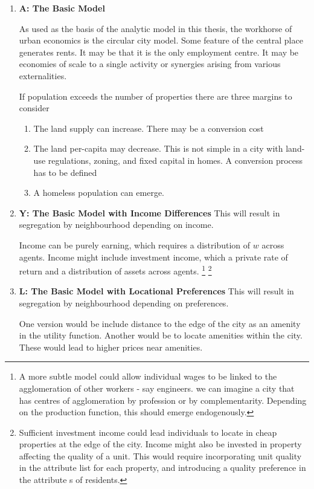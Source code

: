 \begin{enumerate}
\item \textbf{A: The Basic Model}

As used as the basis of the analytic model in this thesis, the workhorse of urban economics is the circular city model. Some feature of the central place generates rents. It may be that it is the only employment centre. It may be economies of scale to a single activity or synergies arising from various externalities.

If population exceeds the number of properties there are three margins to consider
	\begin{enumerate}
		\item The land supply can increase. There may be a conversion cost
		\item The land per-capita may decrease. This is not simple in a city with land-use regulations, zoning, and fixed capital in homes. A conversion process has to be defined
		\item A homeless population can emerge. 
	\end{enumerate}
	
\item \textbf{Y: The Basic Model with Income Differences}
This will result in segregation by neighbourhood depending on income. 

Income can be purely earning, which requires a distribution of $w$ across agents. Income  might include investment income, which  a private rate of return and a distribution of assets across agents. \footnote{A more subtle model could allow individual wages to be linked to the agglomeration of other workers - say engineers. we can imagine a city that has centres of agglomeration by profession or by complementarity. Depending on the production function, this should emerge endogenously.}
\footnote{Sufficient investment income could lead individuals to locate in cheap properties at the edge of the city.  Income might also be invested in property affecting the quality of a unit. This would require incorporating unit quality in the attribute list for each property, and introducing a quality preference  in the attribute s of residents.}


\item \textbf{L: The Basic Model with Locational Preferences}
This will result in segregation by neighbourhood depending on preferences.

One version would be include distance to the edge of the city as an amenity in the utility function. Another would be to locate amenities within the city. These would lead to higher prices near amenities.


\end{enumerate}
